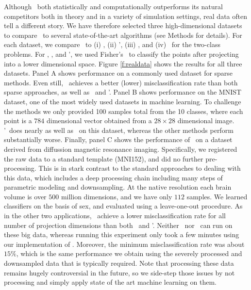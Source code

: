 \documentclass[10pt]{article}
\begin{document}
Although \Lol~both statistically and computationally outperforms its natural competitors both in theory and in a variety of simulation settings, real data often tell a different story.
%
We have  therefore selected three  high-dimensional datasets to compare \Lol~to several state-of-the-art algorithms (see Methods for details).  For each dataset, we compare \Lol~to 
(i) \Pca,
(ii) \Pca',
(iii) \Lasso, and
(iv) \Road~for the two-class problems.
For \Lol, \Pca, and \Pca', we used Fisher's \Lda~to classify the points after projecting into a lower dimensional space.
Figure \ref{f:realdata} shows the results for all three datasets. 
Panel A shows performance on a commonly used dataset for sparse methods.  Even still, \Lol~achieves a better (lower) misclassification rate than both sparse approaches, as well as \Pca~and \Pca'.
Panel B shows performance on the MNIST dataset, one of the most widely used datasets in machine learning.  To challenge the methods we only provided 100 samples total from the 10 classes, where each point is a $784$ dimensional vector obtained from a $28 \times 28$ dimensional image.   \Pca'~does nearly as well as \Lol~on this dataset, whereas the other methods perform substantially worse.
Finally, panel C shows the performance of \Lol~on a dataset derived from diffussion magnetic resonance imaging.  Specifically, we registered the raw data to a standard template (MNI152), and did no further pre-processing.  This is in stark contrast to the standard approaches to dealing with this data, which includes a deep processing chain including many steps of parametric modeling and downsampling.  At the native resolution each brain volume is over $500$ million dimensions, and we have only $112$  samples.  We learned classifiers on the basis of sex, and evaluated using a leave-one-out procedure.  As in the other two applications, \Lol~achieve a lower misclassification rate for all number of projection dimensions than both \Pca~and \Pca'.  Neither \Road~nor \Lasso~can run on these big data, whereas running this experiment only took a few minutes using our implementation of \Lol.  Moreover, the minimum misclassification rate was about $15\%$, which is the same performance we obtain using the severely processed and downsampled data that is typically required.  Note that processing these data remains hugely controversial in the future, so we side-step those issues by not processing and simply apply state of the art machine learning on them.
\end{document}
